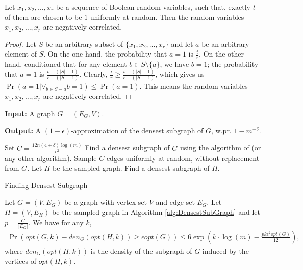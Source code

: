 \begin{lemma}\label{lm:negative}
Let $x_1,x_2,\dots,x_r$ be a sequence of Boolean random variables, such that, exactly $t$ of them are chosen to be $1$ uniformly at random. Then the random variables $x_1,x_2,\dots,x_r$ are negatively correlated. 
\end{lemma}
\begin{proof}
Let $S$ be an arbitrary subset of $\{x_1,x_2,\dots, x_r\}$ and let $a$ be an arbitrary element of $S$. On the one hand, the probability that $a=1$ is $\frac t r$. On the other hand, conditioned that for any element $b\in S \setminus \{a\}$, we have $b=1$; the probability that $a=1$ is $\frac {t-(|S|-1)}{r-(|S|-1)}$. Clearly, $\frac t r \geq \frac {t-(|S|-1)}{r-(|S|-1)}$, which gives us
$\Pr(a=1| \forall_{b\in S-{a}} b=1) \leq \Pr(a=1).$
This means the random variables $x_1,x_2,\dots,x_r$ are negatively correlated. 
\end{proof}

\begin{algorithm*}\textbf{Input:} A graph $G=(E_G,V)$.

\textbf{Output:} A $(1-\epsilon)$-approximation of the densest subgraph of $G$, w.pr. $1-m^{-\delta}$.

\begin{algorithmic}[1]
    \STATE Set $C=\frac {12n (4+\delta) \log(m)} { \epsilon^2}$
    	\STATE Find a densest subgraph of $G$ using the algorithm of \cite{charikar2000greedy} (or any other algorithm).
    \ELSE
    	\STATE Sample $C$ edges uniformly at random, without replacement from $G$.
    	\STATE Let $H$ be the sampled graph.
    	\STATE Find a densest subgraph of $H$.
    \ENDIF
\end{algorithmic}

\caption{Finding Densest Subgraph}
\label{alg:DensestSubGraph}
\end{algorithm*}

\begin{lemma}\label{lm:kBoundDS}
Let $G=(V,E_G)$ be a graph with vertex set $V$ and edge set $E_G$. Let $H=(V,E_H)$ be the sampled graph in Algorithm \ref{alg:DensestSubGraph} and let $p=\frac C {|E_G|}$.
We have for any $k$, 
\begin{align*}
\Pr\left( opt(G,k) - den_G(opt(H,k)) \geq \epsilon   opt(G)\right) \leq 6 \exp(k\cdot \log(m) -\frac{p k \epsilon^2  opt(G)} {12} ),
\end{align*}
where $den_G(opt(H,k))$ is the density of the subgraph of $G$ induced by the vertices of $opt(H,k)$.
\end{lemma}

